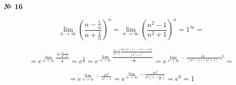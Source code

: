 \documentclass{article}
\begin{document}
\textbf{№ 16} 

\begingroup
\Large

$$ \lim_{n\to \infty} \left( \frac{n-\frac{1}{n}}{n+\frac{1}{n}} \right)^{n}
= \lim_{n\to \infty} \left( \frac{n^2-1}{n^2+1} \right)^{n}
= 1^{\infty} 
= $$

$$ = e^{\lim\limits_{n\to\infty} \frac{\ln{\frac{n^2-1}{n^2+1}}}{\frac{1}{n}}}
= e^{\frac{0}{0}}
= e^{\lim\limits_{n\to\infty} \frac{\frac{n^2-1}{n^2+1} \frac{2n(n^2+1)-(n^2-1)2n}{(n^2+1)^2}}{-\frac{1}{n^2}}} 
= e^{\lim\limits_{n\to\infty} -\frac{4n}{(n^2-1)(n^2+1)}n^2}
= $$

$$ = e^{\lim\limits_{n\to\infty} -\frac{4n^3}{n^4-1}}
= e^{\lim\limits_{n\to\infty} -\frac{4n^3}{n^4(1-\frac{1}{n^4})}} 
= e^{0} 
= 1$$

\endgroup
\end{document}
